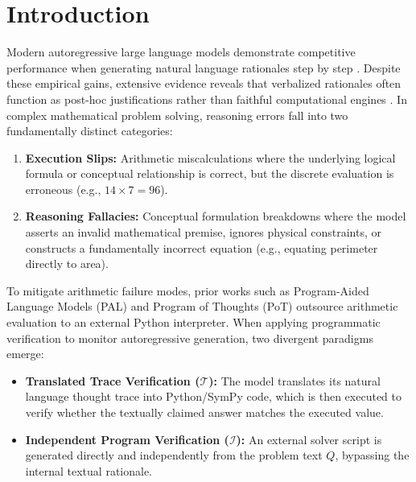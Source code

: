 \documentclass[11pt,a4paper]{article}
\begin{document}
\begin{abstract}
(69.2\% vs. 61.5\%). To resolve the flat-trace repetition versus monolithic-interpreter crash trade-off on symbolic mathematics, we outline an encapsulated Directed Acyclic Graph (DAG) and selective tool-delegation architecture (MSRA) as future work.
\end{abstract}

\section{Introduction}
Modern autoregressive large language models demonstrate competitive performance when generating natural language rationales step by step \citep{wei2022chain, cobbe2021training}. Despite these empirical gains, extensive evidence reveals that verbalized rationales often function as post-hoc justifications rather than faithful computational engines \citep{lanham2023measuring, turpin2024language}. In complex mathematical problem solving, reasoning errors fall into two fundamentally distinct categories:
\begin{enumerate}
    \item \textbf{Execution Slips:} Arithmetic miscalculations where the underlying logical formula or conceptual relationship is correct, but the discrete evaluation is erroneous (e.g., $14 \times 7 = 96$).
    \item \textbf{Reasoning Fallacies:} Conceptual formulation breakdowns where the model asserts an invalid mathematical premise, ignores physical constraints, or constructs a fundamentally incorrect equation (e.g., equating perimeter directly to area).
\end{enumerate}

To mitigate arithmetic failure modes, prior works such as Program-Aided Language Models (PAL) \citep{gao2023pal} and Program of Thoughts (PoT) \citep{chen2023program} outsource arithmetic evaluation to an external Python interpreter. When applying programmatic verification to monitor autoregressive generation, two divergent paradigms emerge:
\begin{itemize}
    \item \textbf{Translated Trace Verification ($\mathcal{T}$):} The model translates its natural language thought trace into Python/SymPy code, which is then executed to verify whether the textually claimed answer matches the executed value.
    \item \textbf{Independent Program Verification ($\mathcal{I}$):} An external solver script is generated directly and independently from the problem text $Q$, bypassing the internal textual rationale.
\end{itemize}
\end{document}
